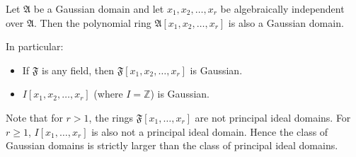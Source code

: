 Let $\mathfrak{A}$ be a Gaussian domain and let $x_1, x_2, \dots, x_r$ be algebraically independent over $\mathfrak{A}$. Then the polynomial ring $\mathfrak{A}[x_1, x_2, \dots, x_r]$ is also a Gaussian domain.

In particular:
\begin{itemize}
\item If $\mathfrak{F}$ is any field, then $\mathfrak{F}[x_1, x_2, \dots, x_r]$ is Gaussian.
\item $I[x_1, x_2, \dots, x_r]$ (where $I = \mathbb{Z}$) is Gaussian.
\end{itemize}

Note that for $r > 1$, the rings $\mathfrak{F}[x_1, \dots, x_r]$ are not principal ideal domains. For $r \geq 1$, $I[x_1, \dots, x_r]$ is also not a principal ideal domain. Hence the class of Gaussian domains is strictly larger than the class of principal ideal domains.
